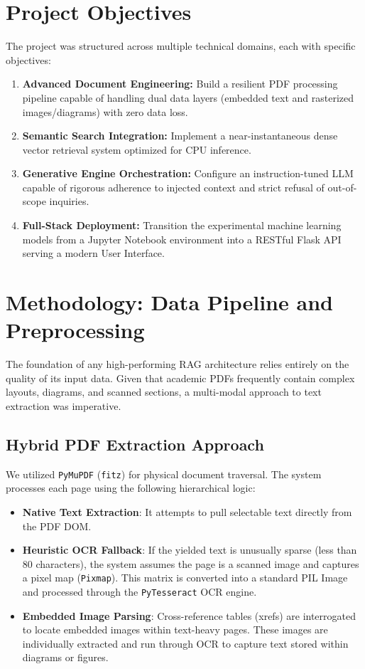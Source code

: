 \documentclass[12pt,a4paper]{article}
\begin{document}
\section{Project Objectives}
The project was structured across multiple technical domains, each with specific objectives:
\begin{enumerate}
    \item \textbf{Advanced Document Engineering:} Build a resilient PDF processing pipeline capable of handling dual data layers (embedded text and rasterized images/diagrams) with zero data loss.
    \item \textbf{Semantic Search Integration:} Implement a near-instantaneous dense vector retrieval system optimized for CPU inference.
    \item \textbf{Generative Engine Orchestration:} Configure an instruction-tuned LLM capable of rigorous adherence to injected context and strict refusal of out-of-scope inquiries.
    \item \textbf{Full-Stack Deployment:} Transition the experimental machine learning models from a Jupyter Notebook environment into a RESTful Flask API serving a modern User Interface.
\end{enumerate}

\section{Methodology: Data Pipeline and Preprocessing}
The foundation of any high-performing RAG architecture relies entirely on the quality of its input data. Given that academic PDFs frequently contain complex layouts, diagrams, and scanned sections, a multi-modal approach to text extraction was imperative.

\subsection{Hybrid PDF Extraction Approach}
We utilized \texttt{PyMuPDF} (\texttt{fitz}) for physical document traversal. The system processes each page using the following hierarchical logic:
\begin{itemize}
    \item \textbf{Native Text Extraction}: It attempts to pull selectable text directly from the PDF DOM.
    \item \textbf{Heuristic OCR Fallback}: If the yielded text is unusually sparse (less than 80 characters), the system assumes the page is a scanned image and captures a pixel map (\texttt{Pixmap}). This matrix is converted into a standard PIL Image and processed through the \texttt{PyTesseract} OCR engine.
    \item \textbf{Embedded Image Parsing}: Cross-reference tables (xrefs) are interrogated to locate embedded images within text-heavy pages. These images are individually extracted and run through OCR to capture text stored within diagrams or figures.
\end{itemize}
\end{document}

